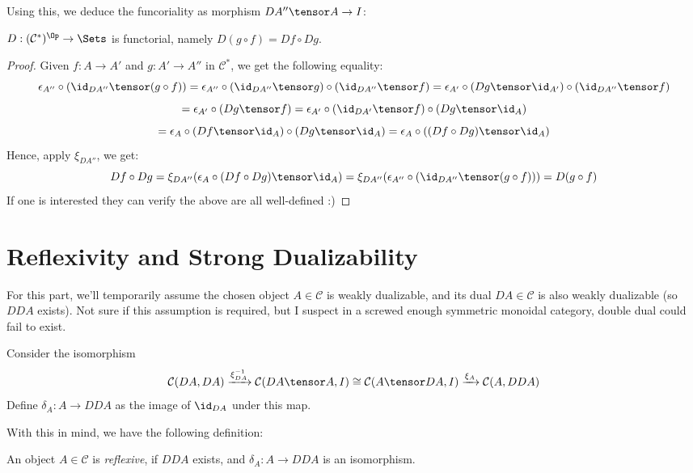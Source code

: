 \documentclass{article}
\begin{document}
Using this, we deduce the funcoriality as morphism $DA''\tensor A\rightarrow I$:
\begin{lem}
    $D:(\mathcal{C}^*)^\Op\rightarrow\Sets$ is functorial, namely $D(g\circ f)= Df\circ Dg$.
\end{lem}
\begin{proof}
    Given $f:A\rightarrow A'$ and $g:A'\rightarrow A''$ in $\mathcal{C}^*$, we get the following equality:
    \[\epsilon_{A''}\circ (\id_{DA''}\tensor (g\circ f)) = \epsilon_{A''}\circ (\id_{DA''}\tensor g)\circ (\id_{DA''}\tensor f)= \epsilon_{A'}\circ (Dg\tensor \id_{A'})\circ (\id_{DA''}\tensor f)\]
    \[= \epsilon_{A'}\circ (Dg\tensor f) = \epsilon_{A'}\circ (\id_{DA'}\tensor f)\circ (Dg\tensor \id_A) \]
    \[= \epsilon_A\circ (Df\tensor \id_A)\circ (Dg\tensor \id_A)= \epsilon_A\circ ((Df\circ Dg)\tensor \id_A)\]
    Hence, apply $\xi_{DA''}$, we get:
    \[Df\circ Dg = \xi_{DA''}(\epsilon_A\circ (Df\circ Dg)\tensor \id_A) = \xi_{DA''}(\epsilon_{A''}\circ (\id_{DA''}\tensor (g\circ f)))= D(g\circ f)\]
    If one is interested they can verify the above are all well-defined :)
\end{proof}

\hfil

\section{Reflexivity and Strong Dualizability}

For this part, we'll temporarily assume the chosen object $A\in\mathcal{C}$ is weakly dualizable, and its dual $DA\in\mathcal{C}$ is also weakly dualizable (so $DDA$ exists). Not sure if this assumption is required, but I suspect in a screwed enough symmetric monoidal category, double dual could fail to exist.

\begin{defn}
    Consider the isomorphism 
    \[\mathcal{C}(DA,DA)\xrightarrow{\xi_{DA}^{-1}}\mathcal{C}(DA\tensor A,I)\cong \mathcal{C}(A\tensor DA,I)\xrightarrow{\xi_A}\mathcal{C}(A,DDA)\]
    Define $\delta_A:A\rightarrow DDA$ as the image of $\id_{DA}$ under this map.
\end{defn}

With this in mind, we have the following definition:
\begin{defn}
    An object $A\in\mathcal{C}$ is \emph{reflexive}, if $DDA$ exists, and $\delta_A:A\rightarrow DDA$ is an isomorphism.\(\)
\end{defn}

\hfil
\end{document}
